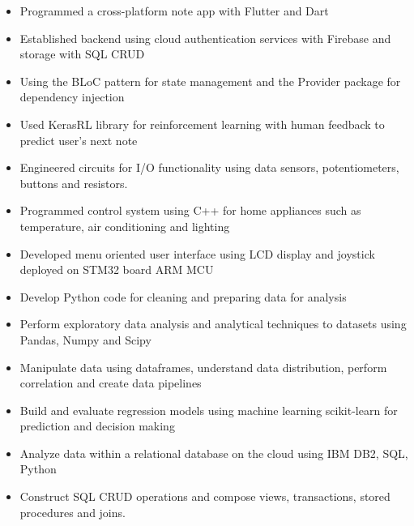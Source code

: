 \documentclass[11pt,a4paper,ragged2e]{altacv}
\begin{document}
\begin{paracol}{1}
\tightdivider


\begin{itemize}
\item Programmed a cross-platform note app with Flutter and Dart
\item Established backend using cloud authentication services with Firebase and storage with SQL CRUD 
\item Using the BLoC pattern for state management and the Provider package for dependency injection
\item Used KerasRL library for reinforcement learning with human feedback to predict user's next note
\end{itemize}
\tightdivider

\begin{itemize}
\item Engineered circuits for I/O functionality using data sensors, potentiometers, buttons and resistors.
\item Programmed control system using C++ for home appliances such as temperature, air conditioning and lighting 
\item Developed menu oriented user interface using LCD display and joystick deployed on STM32 board ARM MCU
\end{itemize}

\medskip

\begin{itemize}
\item Develop Python code for cleaning and preparing data for analysis 
\item Perform exploratory data analysis and analytical techniques to datasets using Pandas, Numpy and Scipy
\item Manipulate data using dataframes, understand data distribution, perform correlation and create data pipelines
\item Build and evaluate regression models using machine learning scikit-learn for prediction and decision making
\end{itemize}
\tightdivider

\begin{itemize}
\item Analyze data within a relational database on the cloud using IBM DB2, SQL, Python
\item Construct SQL CRUD operations and compose views, transactions, stored procedures and joins.
\end{itemize}
\tightdivider


\end{paracol}
\end{document}
